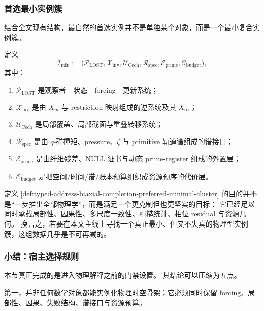 \subsubsection{首选最小实例簇}\label{subsubsec:typed-address-biaxial-completion-preferred-minimal-cluster}
结合全文现有结构，最自然的首选实例并不是单独某个对象，而是一个最小复合实例簇。

\begin{definition}[首选最小实例簇]\label{def:typed-address-biaxial-completion-preferred-minimal-cluster}
定义
\[
\mathcal I_{\min}
:=
\bigl(
\mathcal P_{\mathrm{LOST}},
\mathcal X_{\mathrm{inv}},
\mathcal U_{\mathrm{Cech}},
\mathcal R_{\mathrm{spec}},
\mathcal E_{\mathrm{prime}},
\mathcal C_{\mathrm{budget}}
\bigr),
\]
其中：
\begin{enumerate}
  \item \(\mathcal P_{\mathrm{LOST}}\) 是观察者—状态—forcing—更新系统；
  \item \(\mathcal X_{\mathrm{inv}}\) 是由 \(X_m\) 与 restriction 映射组成的逆系统及其 \(X_\infty\)；
  \item \(\mathcal U_{\mathrm{Cech}}\) 是局部覆盖、局部截面与重叠转移系统；
  \item \(\mathcal R_{\mathrm{spec}}\) 是由 \(q\)-碰撞矩、pressure、\(\zeta\) 与 primitive 轨道谱组成的谱接口；
  \item \(\mathcal E_{\mathrm{prime}}\) 是由纤维残差、\(\mathrm{NULL}\) 证书与动态 prime-register 组成的外置层；
  \item \(\mathcal C_{\mathrm{budget}}\) 是把空间/时间/谱/账本预算组织成资源预序的代价层。
\end{enumerate}
\end{definition}

定义 \ref{def:typed-address-biaxial-completion-preferred-minimal-cluster} 的目的并不是“一步推出全部物理学”，而是满足一个更克制但也更坚实的目标：
它已经足以同时承载局部性、因果性、多尺度一致性、粗糙统计、相位 residual 与资源几何。
换言之，若要在本文主线上寻找一个真正最小、但又不失真的物理型实例簇，这组数据几乎是不可再减的。

\subsubsection{小结：宿主选择规则}\label{subsubsec:typed-address-biaxial-completion-instantiation-summary}
本节真正完成的是进入物理解释之前的门禁设置。
其结论可以压缩为五点。

第一，并非任何数学对象都能实例化物理时空骨架；它必须同时保留 forcing、局部性、因果、失败结构、谱接口与资源预算。

